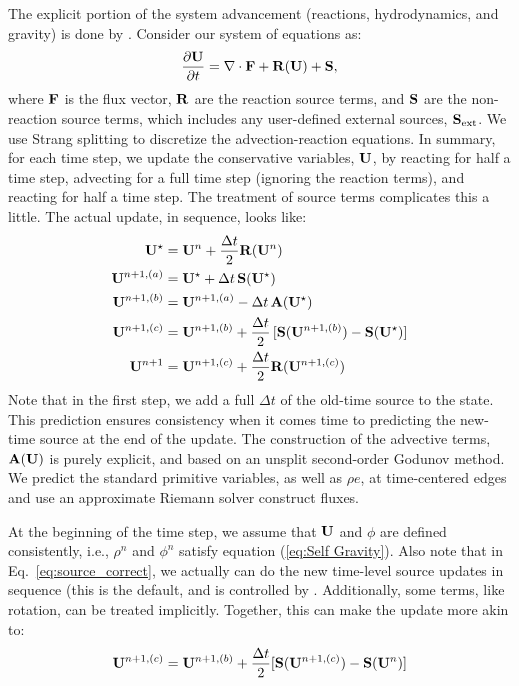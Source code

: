 The explicit portion of the system advancement (reactions,
hydrodynamics, and gravity) is done by .  Consider
our system of equations as:
\begin{equation}
\frac{\partial{\bf U}}{\partial t} = \nabla\cdot{\bf F} + {\bf R}({\bf U}) + {\bf S},
\end{equation}
where ${\bf F}$ is the flux vector, ${\bf R}$ are the reaction
source terms, and ${\bf S}$ are the non-reaction source terms, which
includes any user-defined external sources, ${\bf S}_{\rm ext}$.  We use
Strang splitting to discretize the advection-reaction equations.  In
summary, for each time step, we update the conservative variables,
${\bf U}$, by reacting for half a time step, advecting for a full time
step (ignoring the reaction terms), and reacting for half a time step.
The treatment of source terms complicates this a little.  The actual
update, in sequence, looks like:
\begin{align}
{\bf U}^\star &= {\bf U}^n + \frac{\Delta t}{2}{\bf R}({\bf U}^n) \\
{\bf U}^{n+1,(a)} &= {\bf U}^\star + \Delta t\, {\bf S}({\bf U}^\star) \\
{\bf U}^{n+1,(b)} &= {\bf U}^{n+1,(a)} - \Delta t\, {\bf A}({\bf U}^\star) \\
{\bf U}^{n+1,(c)} &= {\bf U}^{n+1,(b)} + \frac{\Delta t}{2}\, [{\bf S}({\bf U}^{n+1,(b)}) - {\bf S}({\bf U}^\star)] \label{eq:source_correct}\\
{\bf U}^{n+1}     &= {\bf U}^{n+1,(c)} + \frac{\Delta t}{2} {\bf R}({\bf U}^{n+1,(c)})
\end{align}
Note that in the first step, we add a full $\Delta t$ of the old-time
source to the state.  This prediction ensures consistency when it
comes time to predicting the new-time source at the end of the update.
The construction of the advective terms, ${\bf A({\bf U})}$ is purely
explicit, and based on an unsplit second-order Godunov method.  We
predict the standard primitive variables, as well as $\rho e$, at
time-centered edges and use an approximate Riemann solver construct
fluxes.

At the beginning of the time step, we assume that ${\bf U}$ and $\phi$ are
defined consistently, i.e., $\rho^n$ and $\phi^n$ satisfy equation
(\ref{eq:Self Gravity}).  Also note that in
Eq.~\ref{eq:source_correct}, we actually can do the new time-level
source updates in sequence (this is the default, and is controlled by
.  Additionally, some
terms, like rotation, can be treated implicitly.  Together, this can
make the update more akin to:
\begin{equation}
{\bf U}^{n+1,(c)} = {\bf U}^{n+1,(b)} + \frac{\Delta t}{2} [{\bf S}({\bf U}^{n+1,(c)}) - {\bf S}({\bf U}^n)]
\end{equation}

